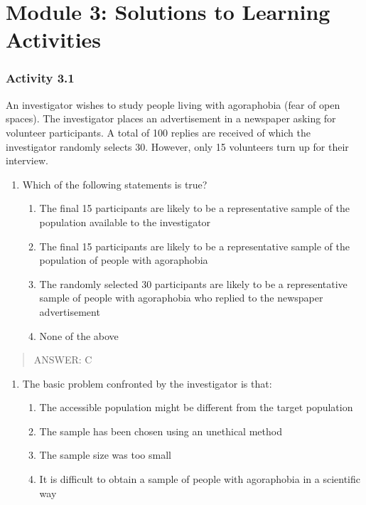 \documentclass[
]{memoir}
\providecommand{\tightlist}{%
  \setlength{\itemsep}{0pt}\setlength{\parskip}{0pt}}
\begin{document}
\hypertarget{module-3-solutions-to-learning-activities}{%
\chapter*{Module 3: Solutions to Learning Activities}\label{module-3-solutions-to-learning-activities}}

\hypertarget{activity-3.1}{%
\subsection*{Activity 3.1}\label{activity-3.1}}

An investigator wishes to study people living with agoraphobia (fear of open spaces). The investigator places an advertisement in a newspaper asking for volunteer participants. A total of 100 replies are received of which the investigator randomly selects 30. However, only 15 volunteers turn up for their interview.

\begin{enumerate}
\def\labelenumi{\arabic{enumi}.}
\tightlist
\item
  Which of the following statements is true?

  \begin{enumerate}
  \def\labelenumii{\alph{enumii})}
  \tightlist
  \item
    The final 15 participants are likely to be a representative sample of the population available to the investigator
  \item
    The final 15 participants are likely to be a representative sample of the population of people with agoraphobia
  \item
    The randomly selected 30 participants are likely to be a representative sample of people with agoraphobia who replied to the newspaper advertisement
  \item
    None of the above
  \end{enumerate}
\end{enumerate}

\begin{quote}
ANSWER: C
\end{quote}

\begin{enumerate}
\def\labelenumi{\arabic{enumi}.}
\setcounter{enumi}{1}
\tightlist
\item
  The basic problem confronted by the investigator is that:

  \begin{enumerate}
  \def\labelenumii{\alph{enumii})}
  \tightlist
  \item
    The accessible population might be different from the target population
  \item
    The sample has been chosen using an unethical method
  \item
    The sample size was too small
  \item
    It is difficult to obtain a sample of people with agoraphobia in a scientific way
  \end{enumerate}
\end{enumerate}
\end{document}
